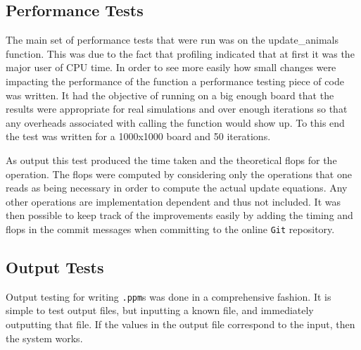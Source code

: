 \subsection{Performance Tests}
The main set of performance tests that were run was on the update\_animals function.
This was due to the fact that profiling indicated that at first it was the major user of CPU time.
In order to see more easily how small changes were impacting the performance of the function a performance testing piece of code was written.
It had the objective of running on a big enough board that the results were appropriate for real simulations and over enough iterations so that any overheads associated with calling the function would show up.
To this end the test was written for a 1000x1000 board and 50 iterations.

As output this test produced the time taken and the theoretical flops for the operation.
The flops were computed by considering only the operations that one reads as being necessary in order to compute the actual update equations.
Any other operations are implementation dependent and thus not included.
It was then possible to keep track of the improvements easily by adding the timing and flops in the commit messages when committing to the online \texttt{Git} repository.

\subsection{Output Tests}
	Output testing for writing \texttt{.ppm}s was done in a comprehensive fashion.
	It is simple to test output files, but inputting a known file, and immediately outputting that file.
	If the values in the output file correspond to the input, then the system works.

